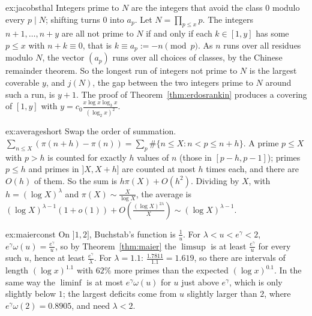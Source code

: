 \begin{solution}{ex:jacobsthal}
\idea Integers prime to $N$ are the integers that avoid the class $0$ modulo every $p\mid N$; shifting turns $0$ into $a_p$.
\writeup Let $N=\prod_{p\le x}p$. The integers $n+1,\dots,n+y$ are all not prime to $N$ if and only if each $k\in[1,y]$ has some $p\le x$ with $n+k\equiv0$, that is $k\equiv a_p:=-n\pmod p$. As $n$ runs over all residues modulo $N$, the vector $(a_p)$ runs over all choices of classes, by the Chinese remainder theorem. So the longest run of integers not prime to $N$ is the largest coverable $y$, and $j(N)$, the gap between the two integers prime to $N$ around such a run, is $y+1$. The proof of Theorem~\ref{thm:erdosrankin} produces a covering of $[1,y]$ with $y=c_0\frac{x\log x\log_3x}{(\log_2x)^2}$.
\end{solution}

\begin{solution}{ex:averageshort}
\idea Swap the order of summation.
\writeup $\sum_{n\le X}(\pi(n+h)-\pi(n))=\sum_p\#\{n\le X:n<p\le n+h\}$. A prime $p\le X$ with $p>h$ is counted for exactly $h$ values of $n$ (those in $[p-h,p-1]$); primes $p\le h$ and primes in $]X,X+h]$ are counted at most $h$ times each, and there are $O(h)$ of them. So the sum is $h\pi(X)+O(h^2)$. Dividing by $X$, with $h=(\log X)^\lambda$ and $\pi(X)\sim\frac X{\log X}$, the average is $(\log X)^{\lambda-1}(1+o(1))+O(\frac{(\log X)^{2\lambda}}X)\sim(\log X)^{\lambda-1}$.
\end{solution}

\begin{solution}{ex:maierconst}
\idea On $]1,2]$, Buchstab's function is $\frac1u$.
\writeup For $\lambda<u<e^\gamma<2$, $e^\gamma\omega(u)=\frac{e^\gamma}u$, so by Theorem~\ref{thm:maier} the $\limsup$ is at least $\frac{e^\gamma}u$ for every such $u$, hence at least $\frac{e^\gamma}\lambda$. For $\lambda=1.1$: $\frac{1.7811}{1.1}=1.619$, so there are intervals of length $(\log x)^{1.1}$ with $62\%$ more primes than the expected $(\log x)^{0.1}$. In the same way the $\liminf$ is at most $e^\gamma\omega(u)$ for $u$ just above $e^\gamma$, which is only slightly below $1$; the largest deficits come from $u$ slightly larger than $2$, where $e^\gamma\omega(2)=0.8905$, and need $\lambda<2$.
\end{solution}

